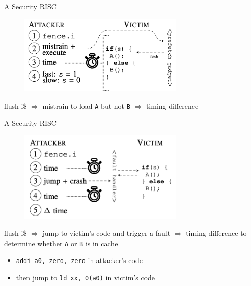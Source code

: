 \documentclass{beamer}
\begin{document}
\begin{frame}{A Security RISC\cite{a-secure-risc}}
\begin{figure}[ht]
    \begin{center}
    \includegraphics[width=0.7\textwidth]{img/cache-time.png}
    \end{center}
\end{figure}
\begin{center}
flush i\$ $\Rightarrow$ mistrain to load \texttt{A} but not \texttt{B} $\Rightarrow$ timing difference
\end{center}
\end{frame}

\begin{frame}{A Security RISC\cite{a-secure-risc}}
\begin{figure}[ht]
    \begin{center}
    \includegraphics[width=0.7\textwidth]{img/flush-fault.png}
    \end{center}
\end{figure}
\begin{center}
    flush i\$ $\Rightarrow$ jump to victim's code and trigger a fault $\Rightarrow$ timing difference to determine whether \texttt{A} or \texttt{B} is in cache 
    \begin{itemize}
        \item \texttt{addi a0, zero, zero} in attacker's code
        \item then jump to \texttt{ld xx, 0(a0)} in victim's code
    \end{itemize}
\end{center}
\end{frame}
\end{document}
